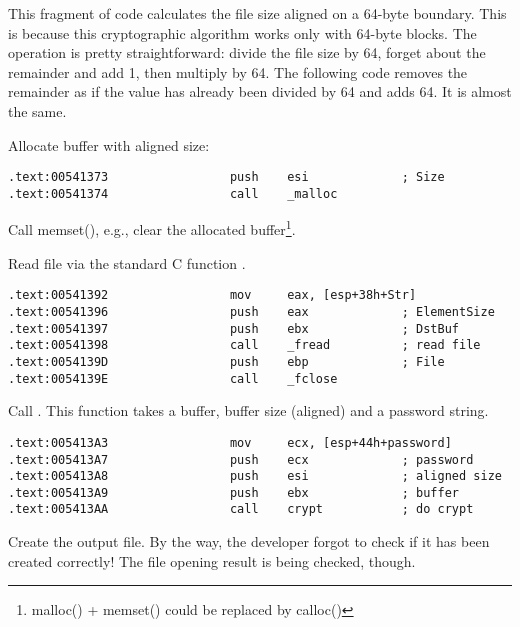 

This fragment of code calculates the file size aligned on a 64-byte boundary. 
This is because this cryptographic algorithm works only with 64-byte blocks. 
The operation is pretty straightforward: divide the file size by 64, forget about the remainder and add 1, 
then multiply by 64. 
The following code removes the remainder as if the value has already been divided by 64 and adds 64. 
It is almost the same.



Allocate buffer with aligned size:

\begin{lstlisting}[style=customasmx86]
.text:00541373                 push    esi             ; Size
.text:00541374                 call    _malloc
\end{lstlisting}

Call memset(), e.g., clear the allocated buffer\footnote{malloc() + memset() could 
be replaced by calloc()}.



Read file via the standard C function .

\begin{lstlisting}[style=customasmx86]
.text:00541392                 mov     eax, [esp+38h+Str]
.text:00541396                 push    eax             ; ElementSize
.text:00541397                 push    ebx             ; DstBuf
.text:00541398                 call    _fread          ; read file
.text:0054139D                 push    ebp             ; File
.text:0054139E                 call    _fclose
\end{lstlisting}

Call . This function takes a buffer, buffer size (aligned) and a password string.

\begin{lstlisting}[style=customasmx86]
.text:005413A3                 mov     ecx, [esp+44h+password]
.text:005413A7                 push    ecx             ; password
.text:005413A8                 push    esi             ; aligned size
.text:005413A9                 push    ebx             ; buffer
.text:005413AA                 call    crypt           ; do crypt
\end{lstlisting}

Create the output file. By the way, the developer forgot to check if it has been created correctly! 
The file opening result is being checked, though.

